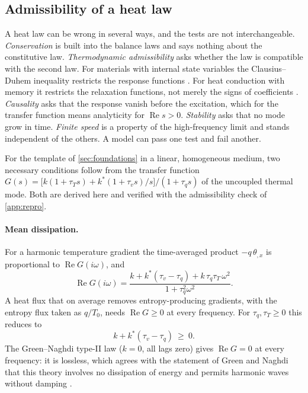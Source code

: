 \subsection{Admissibility of a heat law}\label{sec:admiss}
A heat law can be wrong in several ways, and the tests are not interchangeable. \emph{Conservation} is built into the balance laws and says nothing about the constitutive law. \emph{Thermodynamic admissibility} asks whether the law is compatible with the second law. For materials with internal state variables the Clausius--Duhem inequality restricts the response functions \citep{ColemanGurtin1967}. For heat conduction with memory it restricts the relaxation functions, not merely the signs of coefficients \citep{ChenNunziato1974}. \emph{Causality} asks that the response vanish before the excitation, which for the transfer function means analyticity for $\operatorname{Re}s>0$. \emph{Stability} asks that no mode grow in time. \emph{Finite speed} is a property of the high-frequency limit and stands independent of the others. A model can pass one test and fail another.

For the template of \cref{sec:foundations} in a linear, homogeneous medium, two necessary conditions follow from the transfer function $G(s)=\bigl[k(1+\tau_Ts)+k^*(1+\tau_vs)/s\bigr]/(1+\tau_qs)$ of the uncoupled thermal mode. Both are derived here and verified with the admissibility check of \cref{app:repro}.

\paragraph{Mean dissipation.} For a harmonic temperature gradient the time-averaged product $-q\,\theta_{,x}$ is proportional to $\operatorname{Re}G(i\omega)$, and
\begin{equation}\label{eq:reG}
\operatorname{Re}G(i\omega)=\frac{k+k^*(\tau_v-\tau_q)+k\,\tau_q\tau_T\,\omega^2}{1+\tau_q^2\omega^2}.
\end{equation}
A heat flux that on average removes entropy-producing gradients, with the entropy flux taken as $q/T_0$, needs $\operatorname{Re}G\ge0$ at every frequency. For $\tau_q,\tau_T\ge0$ this reduces to
\begin{equation}\label{eq:admiss}
k+k^*(\tau_v-\tau_q)\ \ge\ 0 .
\end{equation}
The Green--Naghdi type-II law ($k=0$, all lags zero) gives $\operatorname{Re}G=0$ at every frequency: it is lossless, which agrees with the statement of Green and Naghdi that this theory involves no dissipation of energy and permits harmonic waves without damping \citep{Green1993}.

